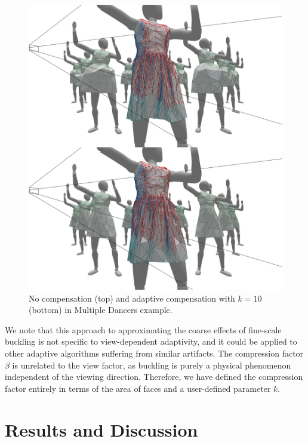 \documentclass[10pt,journal,compsoc,twoside]{TexInputs/IEEEtran}
\begin{document}
\begin{figure}[t]
  \centering
  \includegraphics[width=1.0\columnwidth]{subelement_compression/no_vs_adaptive}
  \caption{No compensation (top) and adaptive compensation with $k = 10$ (bottom) in Multiple
  Dancers example.}
  \label{fig:no_vs_adaptive}
\end{figure}

We note that this approach to approximating the coarse effects of fine-scale buckling
is not specific to view-dependent adaptivity, and it could be applied to
 other adaptive algorithms suffering from similar artifacts.  The compression
factor $\beta$ is unrelated to the view factor, as buckling is purely a physical phenomenon independent of the viewing direction. Therefore, we have defined the compression factor
entirely in terms of the area of faces and a user-defined parameter $k$.


\section{Results and Discussion}
\end{document}
